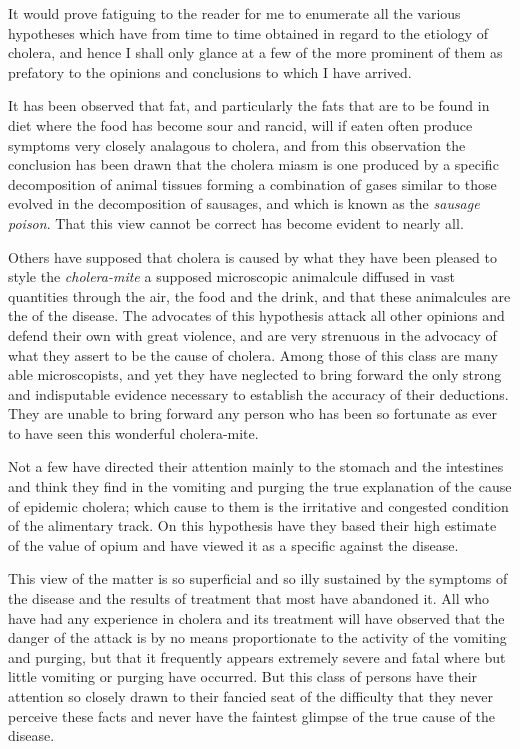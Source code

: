 
It would prove fatiguing to the reader for me to enumerate all the
various hypotheses which have from time to time obtained in regard to
the etiology of cholera, and hence I shall only glance at a few of the
more prominent of them as prefatory to the opinions and conclusions to
which I have arrived.


It has been observed that fat, and particularly the fats that are to be
found in diet where the food has become sour and rancid, will if eaten
often produce symptoms very closely analagous to cholera, and from
this observation the conclusion has been drawn that the cholera miasm
is one produced by a specific decomposition of animal tissues forming
a combination of gases similar to those evolved in the decomposition
of sausages, and which is known as the \emph{sausage poison}. That this
view cannot be correct has become evident to nearly all.


Others have supposed that cholera is caused by what they have been
pleased to style the \emph{cholera-mite} a supposed microscopic animalcule
diffused in vast quantities through the air, the food and the drink, and
that these animalcules are the  of the disease. The
advocates of this hypothesis attack all other opinions and defend their
own with great violence, and are very strenuous in the advocacy of
what they assert to be the cause of cholera. Among those of this
class are many able microscopists, and yet they have neglected to bring
forward the only strong and indisputable evidence necessary to establish
the accuracy of their deductions. They are unable to bring forward
any person who has been so fortunate as ever to have seen this
wonderful cholera-mite.


Not a few have directed their attention mainly to the stomach and
the intestines and think they find in the vomiting and purging the true
explanation of the cause of epidemic cholera; which cause to them is
the irritative and congested condition of the alimentary track. On
this hypothesis have they based their high estimate of the value of
opium and have viewed it as a specific against the disease.


This view of the matter is so superficial and so illy sustained by the
symptoms of the disease and the results of treatment that most have
abandoned it. All who have had any experience in cholera and its
treatment will have observed that the danger of the attack is by no
means proportionate to the activity of the vomiting and purging, but
that it frequently appears extremely severe and fatal where but little
vomiting or purging have occurred. But this class of persons have
their attention so closely drawn to their fancied seat of the difficulty
that they never perceive these facts and never have the faintest glimpse
of the true cause of the disease.\endinput